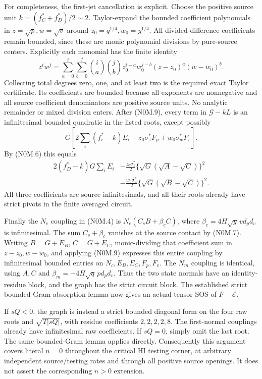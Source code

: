 For completeness, the first-jet cancellation is explicit. Choose the
positive source unit $k=(f_C^*+f_D^*)/2\sim2$. Taylor-expand the bounded
coefficient polynomials in $z=\sqrt p,w=\sqrt v$ around
$z_0=q^{1/4},w_0=y^{1/4}$. All divided-difference coefficients remain
bounded, since these are monic polynomial divisions by pure-source
centers. Explicitly each monomial has the finite identity
\[
 z^iw^j=\sum_{a=0}^i\sum_{b=0}^j
 {i\choose a}{j\choose b}z_0^{i-a}w_0^{j-b}
 (z-z_0)^a(w-w_0)^b.
\]
Collecting total degrees zero, one, and at least two is the required
exact Taylor certificate. Its coefficients are bounded because all
exponents are nonnegative and all source coefficient denominators are
positive source units. No analytic remainder or mixed division enters.
After (N0M.9), every term in $\mathcal G-kL$ is an infinitesimal
bounded quadratic in the listed roots, except possibly
\[
 G\left[2\sum_i(f_i^*-k)E_i
       +z_0\sigma_z^*F_p+w_0\sigma_w^*F_v\right].
\]
By (N0M.6) this equals
\begin{align*}
 2(f_D^*-k)G\sum_iE_i
 &-\frac{z_0\sigma_z^*}{2}
       \{\sqrt G(\sqrt A-\sqrt C)\}^2\\
 &-\frac{w_0\sigma_w^*}{2}
       \{\sqrt G(\sqrt B-\sqrt C)\}^2.
\end{align*}
All three coefficients are source infinitesimals, and all their roots
already have strict pivots in the finite averaged circuit.

Finally the $N_c$ coupling in (N0M.4) is
$N_c(C_sB+\beta_cC)$, where
$\beta_c=4H\sqrt y\,v d_pd_v$ is infinitesimal.
The sum $C_s+\beta_c$ vanishes at the source contact by (N0M.7).
Writing $B=G+E_B$, $C=G+E_C$, monic-dividing that coefficient sum in
$z-z_0,w-w_0$, and applying (N0M.9) expresses this entire coupling by
infinitesimal bounded entries on $N_c,E_B,E_C,F_p,F_v$. The $N_m$
coupling is identical, using $A,C$ and
$\beta_m=-4H\sqrt q\,p d_pd_v$. Thus the two state normals have an
identity-residue block, and the graph has the strict circuit block.
The established strict bounded-Gram absorption lemma now gives an
actual tensor SOS of $F-\mathcal E$.

If $sQ<0$, the graph is instead a strict bounded diagonal form on the
four raw roots and $\sqrt{T|sQ|}$, with residue coefficients
$2,2,2,2,8$. The first-normal couplings already have infinitesimal raw
coefficients. If $sQ=0$, simply omit the last root. The same bounded-Gram
lemma applies directly. Consequently this argument covers literal
$n=0$ throughout the critical HI testing corner, at arbitrary independent
source/testing rates and through all positive source openings. It does
not assert the corresponding $n>0$ extension.



